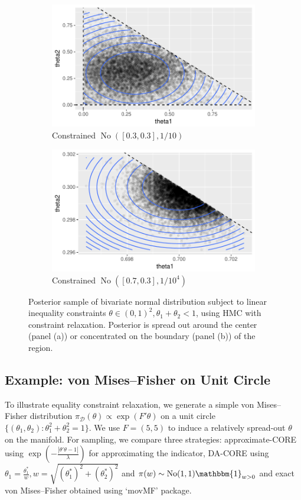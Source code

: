 \documentclass[10pt,fleqn]{article}
\newcommand{\mc}[1]{\mathcal{#1}}
\DeclareMathOperator{\No}{No}
\DeclareMathOperator{\1}{\mathbbm{1}}
\begin{document}
\begin{figure}[H]
\begin{subfigure}[b]{0.45\textwidth}
\includegraphics[width=1\textwidth]{linear_inequal_1}
\caption{Constrained $\No([0.3,0.3],1/{10})$}
\end{subfigure}
\begin{subfigure}[b]{0.45\textwidth}
\includegraphics[width=1\textwidth]{linear_inequal_2}
\caption{Constrained $\No([0.7,0.3],1/{10^4})$}
\end{subfigure}
\caption{Posterior sample of bivariate normal distribution subject to linear inequality constraints $\theta\in(0,1)^2,\theta_1+\theta_2<1$, using HMC with  constraint relaxation. Posterior is spread out around the center (panel (a)) or concentrated on the boundary (panel (b)) of the region.}
\label{linear_inequality}
\end{figure}


\subsection{Example: von Mises--Fisher on Unit Circle}
To illustrate equality constraint relaxation, we generate a simple von Mises--Fisher distribution $\pi_{\mc D}(\theta) \propto \exp(F'\theta)$ on a unit circle $\{(\theta_1,\theta_2):\theta_1^2+\theta_2^2=1\}$. We use $F=(5,5)$ to induce a relatively spread-out  $\theta$ on the manifold.
For sampling,
we compare three strategies: approximate-CORE using $\exp(-\frac{|\theta'\theta -1|}{\lambda})$ for approximating the indicator, DA-CORE
using $\theta_1 = \frac{\theta_1^*}{w}, w= \sqrt{(\theta_1^*)^2+ (\theta_2^*)^2}$ and $\pi(w)\sim \No(1,1)\mathbbm{1}_{w>0}$ and  exact  von Mises--Fisher obtained using `movMF' package.
\end{document}
